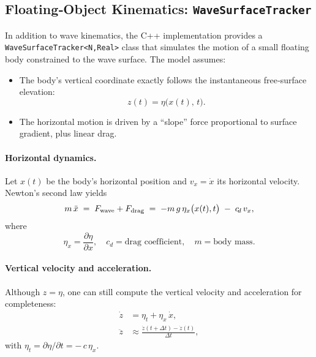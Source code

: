 \documentclass[11pt,letterpaper]{article}
\begin{document}
\subsection{Floating‐Object Kinematics: \texttt{WaveSurfaceTracker}}
\label{sec:wave_surface_tracker}

In addition to wave kinematics, the C++ implementation provides a\\
\texttt{WaveSurfaceTracker<N,Real>} class that simulates 
the motion of a small floating body constrained to the wave surface.  The model assumes:

\begin{itemize}
  \item The body’s vertical coordinate exactly follows the instantaneous free‐surface elevation:
    \[
      z(t) = \eta\bigl(x(t),\,t\bigr).
    \]
  \item The horizontal motion is driven by a “slope” force proportional to surface gradient, plus linear drag.
\end{itemize}

\paragraph{Horizontal dynamics.}  
Let \(x(t)\) be the body’s horizontal position and \(v_x = \dot x\) its horizontal velocity.  Newton’s second law yields
\begin{equation}
  m\,\ddot x \;=\; F_{\rm wave} + F_{\rm drag}
  \;=\;-m\,g\,\eta_x\bigl(x(t),t\bigr)
    \;-\;c_{\!d}\,v_x,
  \label{eq:tracker_motion}
\end{equation}
where
\[
  \eta_x = \frac{\partial \eta}{\partial x}, 
  \quad
  c_{\!d} = \text{drag coefficient}, 
  \quad
  m = \text{body mass}.
\]

\paragraph{Vertical velocity and acceleration.}  
Although \(z=\eta\), one can still compute the vertical velocity and acceleration for completeness:
\begin{align}
  \dot z &= \eta_t + \eta_x\,\dot x,
  \\
  \ddot z &\approx \frac{\dot z(t+\Delta t)-\dot z(t)}{\Delta t},
\end{align}
with \(\eta_t = \partial\eta/\partial t = -\,c\,\eta_x\).
\end{document}
